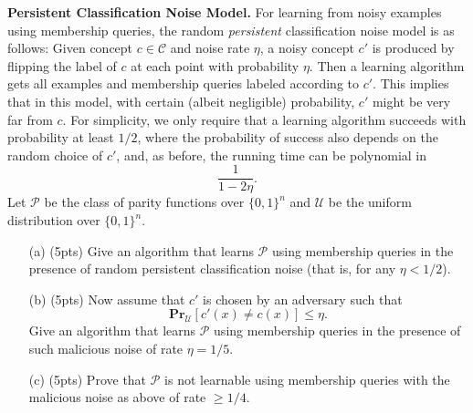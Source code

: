 \documentclass[11pt]{article}
\DeclareMathOperator{\1}{\mathbbm{1}}
\begin{document}
\begin{problem} [15 pts] \textbf{Persistent Classification Noise Model.}
For learning from noisy examples using membership queries, the random \textit{persistent} classification noise model is as follows: Given concept $c \in \mathcal{C}$ and noise rate $\eta$, a noisy concept $c'$ is produced by flipping the label of $c$ at each point with probability $\eta$. Then a learning algorithm gets all examples and membership queries labeled according to $c'$. This implies that in this model, with certain (albeit negligible) probability, $c'$ might be very far from $c$. For simplicity, we only require that a learning algorithm succeeds with probability at least $1/2$, where the probability of success also depends on the random choice of $c'$, and, as before, the running time can be polynomial in 
\[
\frac{1}{1-2\eta}.
\]
Let $\mathcal{P}$ be the class of parity functions over $\{0,1\}^n$ and $\mathcal{U}$ be the uniform distribution over $\{0,1\}^n$.

\begin{enumerate}
    \item[(a)] (5pts) Give an algorithm that learns $\mathcal{P}$ using membership queries in the presence of random persistent classification noise (that is, for any $\eta < 1/2$).
    \item[(b)] (5pts) Now assume that $c'$ is chosen by an adversary such that 
    \[
    \mathbf{Pr}_{\mathcal{U}}[c'(x) \neq c(x)] \leq \eta.
    \]
    Give an algorithm that learns $\mathcal{P}$ using membership queries in the presence of such malicious noise of rate $\eta = 1/5$.
    \item[(c)] (5pts) Prove that $\mathcal{P}$ is not learnable using membership queries with the malicious noise as above of rate $\geq 1/4$.
\end{enumerate}
\end{problem}
\end{document}
